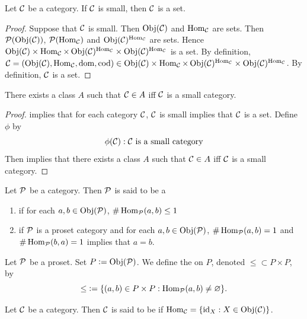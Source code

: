 \documentclass{book}
\begin{document}
	\begin{ex} 
		Let $\MC$ be a category. If $\MC$ is small, then $\MC$ is a set. 
	\end{ex}
	
	\begin{proof}
		Suppose that $\MC$ is small. Then $\Obj(\MC)$ and $\Hom_{\MC}$ are sets. Then $\MP(\Obj(\MC))$, $\MP(\Hom_{\MC})$ and $\Obj(\MC)^{\Hom_{\MC}}$ are sets. Hence $\Obj(\MC) \times \Hom_{\MC} \times \Obj(\MC)^{\Hom_{\MC}} \times \Obj(\MC)^{\Hom_{\MC}}$ is a set. By definition, $\MC = (\Obj(\MC), \Hom_{\MC}, \dom, \cod) \in \Obj(\MC) \times \Hom_{\MC} \times \Obj(\MC)^{\Hom_{\MC}} \times \Obj(\MC)^{\Hom_{\MC}}$. By definition, $\MC$ is a set. 
	\end{proof}
	
	\begin{ex} 
		There exists a class $A$ such that $\MC \in A$ iff $\MC$ is a small category. 
	\end{ex}
	
	\begin{proof}
		 implies that for each category $\MC$, $\MC$ is small implies that $\MC$ is a set. Define $\phi$ by $$\phi(\MC): \MC \text{ is a small category} $$ 
		Then  implies that there exists a class $A$ such that $\MC \in A$ iff $\MC$ is a small category.  
	\end{proof}
	
	\begin{defn}
		Let $\MP$ be a category. Then $\MP$ is said to be a 
		\begin{enumerate}
			\item {} if for each $a, b \in \Obj(\MP)$, $\# \Hom_{\MP}(a,b) \leq 1$
			\item {} if $\MP$ is a proset category and for each $a,b \in \Obj(\MP)$, $\# \Hom_{\MP}(a,b) = 1$ and $\# \Hom_{\MP}(b,a) = 1$ implies that $a = b$.  
		\end{enumerate}
	\end{defn}
	
	\begin{defn}
		Let $\MP$ be a proset. Set $P \defeq \Obj(\MP)$. We define the  on $P$, denoted ${\leq} \subset P \times P$, by 
		$${\leq} \defeq \{(a,b) \in P \times P: \Hom_{\MP}(a,b) \neq \varnothing\}.$$
	\end{defn}
	
	\begin{defn}  
		Let $\MC$ be a category. Then $\MC$ is said to be  if $\Hom_{\MC} = \{\id_X: X \in \Obj(\MC)\}$. 
	\end{defn}
	
\end{document}
